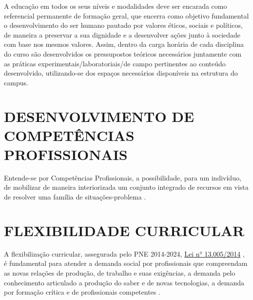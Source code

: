 A educação em todos os seus níveis e modalidades deve ser encarada como referencial permanente de formação geral, que encerra como objetivo fundamental o desenvolvimento do ser humano pautado por valores éticos, sociais e políticos, de maneira a preservar a sua dignidade e a desenvolver ações junto à sociedade com base nos mesmos valores. Assim, dentro da carga horária de cada disciplina do curso são desenvolvidos os pressupostos teóricos necessários juntamente com as práticas experimentais/laboratoriais/de campo pertinentes ao conteúdo desenvolvido, utilizando-se dos espaços necessários disponíveis na estrutura do campus.


\section{DESENVOLVIMENTO DE COMPETÊNCIAS PROFISSIONAIS}
\label{sec:desen}

Entende-se por Competências Profissionais, a possibilidade, para um indivíduo, de mobilizar de maneira interiorizada um conjunto integrado de recursos em vista de resolver uma família de situações-problema \cite{scallon2017}. 


\section{FLEXIBILIDADE CURRICULAR}
\label{sec:flex}

A flexibilização curricular, assegurada pelo PNE 2014-2024, \href{http://www.planalto.gov.br/ccivil_03/_ato2011-2014/2014/lei/l13005.htm}{Lei n° 13.005/2014} \cite{Lei:13005:2014}, é fundamental para atender a demanda social por profissionais que compreendam as novas relações de produção, de trabalho e suas exigências, a demanda pelo conhecimento articulado a produção do saber e de novas tecnologias, a demanda por formação crítica e de profissionais competentes \cite{pdiutfpr}.


